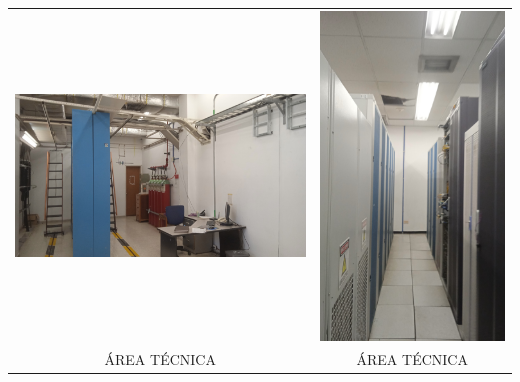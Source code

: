 \documentclass[12pt,a4paper,twoside]{article}
\begin{document}
{\begin{tabular}{ c c }
	\includegraphics[width = 7 cm]{Imagenes/5} & \includegraphics[width = 3 cm]{Imagenes/6} \\
	ÁREA TÉCNICA  & ÁREA TÉCNICA   \\

	
\end{tabular} 

\begin{tabular}{ c c }
	

\end{tabular}}
\end{document}

